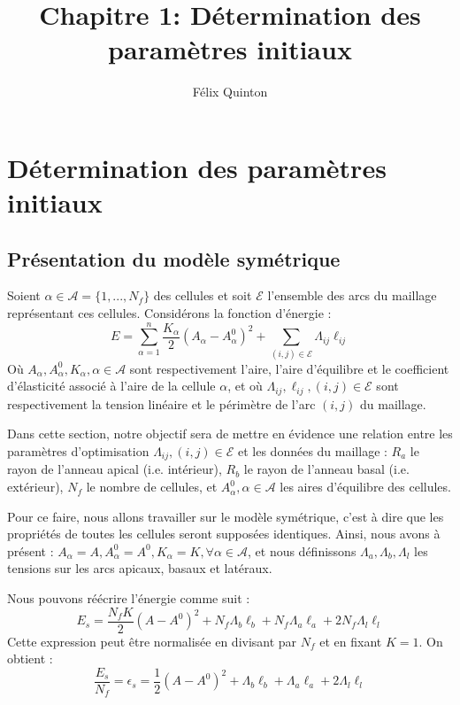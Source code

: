 \documentclass[11pt,a4paper]{article}
\title{Chapitre 1: Détermination des paramètres initiaux}
\author{Félix Quinton}
\begin{document}
\maketitle
\thispagestyle{empty}

\section{Détermination des paramètres initiaux}

\subsection{Présentation du modèle symétrique}

Soient $\alpha \in \mathcal{A} = \{1, ..., N_f\}$ des cellules et soit $\mathcal{E}$ l'ensemble des arcs du maillage représentant ces cellules. Considérons la fonction d'énergie :
$$
E = \sum_{\alpha = 1}^n\frac{K_\alpha}{2}(A_\alpha-A_\alpha^0)^2 + \sum_{(i,j) \in \mathcal{E}}\Lambda_{ij}\ell_{ij}
$$
Où $A_\alpha, A_\alpha^0, K_\alpha, \alpha \in \mathcal{A}$ sont respectivement l'aire, l'aire d'équilibre et le coefficient d'élasticité associé à l'aire de la cellule $\alpha$, et où $\Lambda_{ij}, \ell_{ij}, (i,j) \in \mathcal{E}$ sont respectivement la tension linéaire et le périmètre de l'arc $(i,j)$ du maillage.

Dans cette section, notre objectif sera de mettre en évidence une relation entre les paramètres d'optimisation $\Lambda_{ij}, (i,j) \in \mathcal{E}$ et les données du maillage : $R_a$ le rayon de l'anneau apical (i.e. intérieur), $R_b$ le rayon de l'anneau basal (i.e. extérieur), $N_f$ le nombre de cellules, et $A_\alpha^0, \alpha \in \mathcal{A}$ les aires d'équilibre des cellules.

Pour ce faire, nous allons travailler sur le modèle symétrique, c'est à dire que les propriétés de toutes les cellules seront supposées identiques. Ainsi, nous avons à présent : $A_\alpha = A, A_\alpha^0 = A^0, K_\alpha = K, \forall \alpha \in \mathcal{A}$, et nous définissons $\Lambda_a, \Lambda_b, \Lambda_l$ les tensions sur les arcs apicaux, basaux et latéraux.

Nous pouvons réécrire l'énergie comme suit :
$$
E_s = \frac{N_f K}{2}(A-A^0)^2 + N_f\Lambda_b\ell_b + N_f\Lambda_a\ell_a + 2N_f\Lambda_l\ell_l
$$
Cette expression peut être normalisée en divisant par $N_f$ et en fixant $K=1$. On obtient :
$$
\frac{E_s}{N_f} = \epsilon_s = \frac{1}{2}(A - A^0)^2 + \Lambda_b\ell_b + \Lambda_a\ell_a + 2\Lambda_l\ell_l
$$
\end{document}
